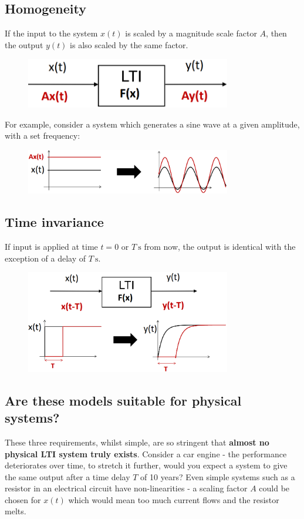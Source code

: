 \documentclass[class=report, crop=false, 12pt,a4paper, tikz, border=4mm]{standalone}
\begin{document}
\subsection{Homogeneity}
If the input to the system $x(t)$ is scaled by a magnitude scale factor $A$, then the output $y(t)$ is also scaled by the same factor.
\begin{figure}[H]
  \centering
  \includegraphics[width = 0.8\textwidth]{../img/blockdiagram7.png}
\end{figure}
For example, consider a system which generates a sine wave at a given amplitude, with a set frequency:
\begin{figure}[H]
  \centering
  \includegraphics[width = 0.8\textwidth]{../img/graphs2.png}
\end{figure}
\subsection{Time invariance}
If input is applied at time $t=0$ or $T \ \si{\second}$ from now, the output is identical with the exception of a delay of $T \ \si{\second}$.
\begin{figure}[H]
  \centering
  \includegraphics[width = 0.8\textwidth]{../img/blockdiagram8.png}
\end{figure}
\subsection*{Are these models suitable for physical systems?}
These three requirements, whilst simple, are so stringent that \textbf{almost no physical LTI system truly exists}. Consider a car engine - the performance deteriorates over time, to stretch it further, would you expect a system to give the same output after a time delay $T$ of 10 years? Even simple systems such as a resistor in an electrical circuit have non-linearities - a scaling factor $A$ could be chosen for $x(t)$ which would mean too much current flows and the resistor melts.
\end{document}
